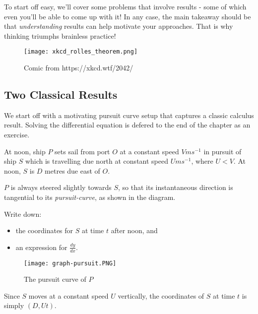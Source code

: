 \documentclass[../jarvis.tex]{subfiles}
\begin{document}
To start off easy, we'll cover some problems that involve results - some of which even you'll be able to come up with it! In any case, the main takeaway should be that \textit{understanding} results can help motivate your approaches. That is why thinking triumphs brainless practice!

\begin{figure}[H]
    \centering
    \texttt{[image: xkcd\_rolles\_theorem.png]}
    \caption{Comic from https://xkcd.wtf/2042/}
\end{figure}

\subsection{Two Classical Results}
We start off with a motivating pursuit curve setup that captures a classic calculus result. Solving the differential equation is defered to the end of the chapter as an exercise.
\begin{example}
At noon, ship $P$ sets sail from port $O$ at a constant speed $V ms^{-1}$ in pursuit of ship $S$ which is travelling due north at constant speed $U ms^{-1}$, where $U < V$. At noon, $S$ is $D$ metres due east of $O$.

$P$ is always steered slightly towards $S$, so that its instantaneous direction is tangential to its \textit{pursuit-curve}, as shown in the diagram.

Write down:
\begin{itemize}
    \item the coordinates for $S$ at time $t$ after noon, and
    \item an expression for $\frac{dy}{dx}$.
\end{itemize}
\end{example}
\begin{figure}[H]
    \centering
    \texttt{[image: graph-pursuit.PNG]}
    \caption{The pursuit curve of $P$}
    \label{fig:graph-pursuit}
\end{figure}
Since $S$ moves at a constant speed $U$ vertically, the coordinates of $S$ at time $t$ is simply $(D, Ut)$. 
\end{document}
